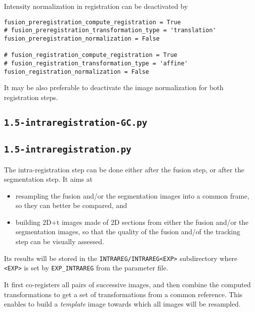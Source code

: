 Intensity normalization in registration can be deactivated by
\begin{verbatim}
fusion_preregistration_compute_registration = True
# fusion_preregistration_transformation_type = 'translation'
fusion_preregistration_normalization = False

# fusion_registration_compute_registration = True
# fusion_registration_transformation_type = 'affine'
fusion_registration_normalization = False
\end{verbatim}
It may be also preferable to  deactivate the image normalization for both registration steps.

%
%
%


\subsection{\texttt{1.5-intraregistration-GC.py}}

\subsection{\texttt{1.5-intraregistration.py}}

The intra-registration step can be done either after the fusion step, or after the segmentation step. It aims at
\begin{itemize}
\item resampling the fusion and/or the segmentation images into a common frame, so they can better be compared, and
\item building 2D+t images made of 2D sections from either the  fusion and/or the segmentation images, so that the quality of the fusion and/of the tracking step can be visually assessed.
\end{itemize}
Its results will be stored in the \verb|INTRAREG/INTRAREG<EXP>| subdirectory where \verb|<EXP>| is set by \verb|EXP_INTRAREG| from the parameter file.



It first co-registers all pairs of successive images, and then combine the computed transformations to get a set of  transformations from a common reference. This enables to build a \textit{template} image towards which all images will be resampled.

